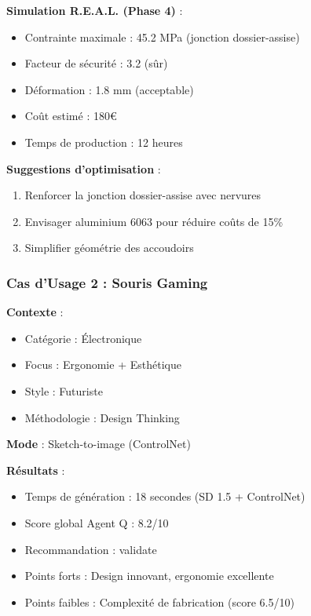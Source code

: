 \textbf{Simulation R.E.A.L. (Phase 4)} :

\begin{itemize}[leftmargin=*]
    \item Contrainte maximale : 45.2 MPa (jonction dossier-assise)
    \item Facteur de sécurité : 3.2 (sûr)
    \item Déformation : 1.8 mm (acceptable)
    \item Coût estimé : 180€
    \item Temps de production : 12 heures
\end{itemize}

\textbf{Suggestions d'optimisation} :
\begin{enumerate}[leftmargin=*]
    \item Renforcer la jonction dossier-assise avec nervures
    \item Envisager aluminium 6063 pour réduire coûts de 15\%
    \item Simplifier géométrie des accoudoirs
\end{enumerate}

\subsubsection{Cas d'Usage 2 : Souris Gaming}

\textbf{Contexte} :
\begin{itemize}[leftmargin=*]
    \item Catégorie : Électronique
    \item Focus : Ergonomie + Esthétique
    \item Style : Futuriste
    \item Méthodologie : Design Thinking
\end{itemize}

\textbf{Mode} : Sketch-to-image (ControlNet)

\textbf{Résultats} :
\begin{itemize}[leftmargin=*]
    \item Temps de génération : 18 secondes (SD 1.5 + ControlNet)
    \item Score global Agent Q : 8.2/10
    \item Recommandation : validate
    \item Points forts : Design innovant, ergonomie excellente
    \item Points faibles : Complexité de fabrication (score 6.5/10)
\end{itemize}

